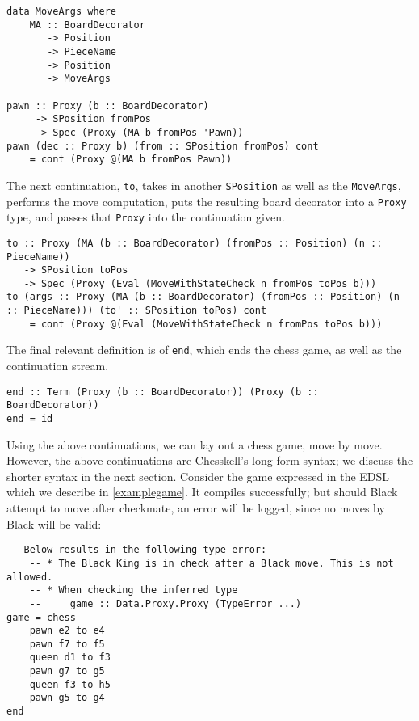\documentclass[12pt, a4paper, bibliography=totocnumbered]{scrreprt}
\newcommand{\inline}[1]{\lstinline[basicstyle=\ttfamily\footnotesize]{#1}}
\begin{document}
\begin{lstlisting}
data MoveArgs where
    MA :: BoardDecorator
       -> Position
       -> PieceName
       -> Position
       -> MoveArgs

pawn :: Proxy (b :: BoardDecorator)
     -> SPosition fromPos
     -> Spec (Proxy (MA b fromPos 'Pawn))
pawn (dec :: Proxy b) (from :: SPosition fromPos) cont
    = cont (Proxy @(MA b fromPos Pawn))
\end{lstlisting}

The next continuation, \inline{to}, takes in another \inline{SPosition} as well as the \lstinline{MoveArgs}, performs the move computation, puts the resulting board decorator into a \inline{Proxy} type, and passes that \inline{Proxy} into the continuation given.

\begin{lstlisting}
to :: Proxy (MA (b :: BoardDecorator) (fromPos :: Position) (n :: PieceName))
   -> SPosition toPos
   -> Spec (Proxy (Eval (MoveWithStateCheck n fromPos toPos b)))
to (args :: Proxy (MA (b :: BoardDecorator) (fromPos :: Position) (n :: PieceName))) (to' :: SPosition toPos) cont
    = cont (Proxy @(Eval (MoveWithStateCheck n fromPos toPos b)))
\end{lstlisting}

The final relevant definition is of \inline{end}, which ends the chess game, as well as the continuation stream.

\begin{lstlisting}
end :: Term (Proxy (b :: BoardDecorator)) (Proxy (b :: BoardDecorator))
end = id
\end{lstlisting}

Using the above continuations, we can lay out a chess game, move by move. However, the above continuations are Chesskell's long-form syntax; we discuss the shorter syntax in the next section. Consider the game expressed in the EDSL which we describe in \cref{examplegame}. It compiles successfully; but should Black attempt to move after checkmate, an error will be logged, since no moves by Black will be valid:

\begin{lstlisting}
-- Below results in the following type error:
    -- * The Black King is in check after a Black move. This is not allowed.
    -- * When checking the inferred type
    --     game :: Data.Proxy.Proxy (TypeError ...)
game = chess
    pawn e2 to e4
    pawn f7 to f5
    queen d1 to f3
    pawn g7 to g5
    queen f3 to h5
    pawn g5 to g4
end
\end{lstlisting}
\end{document}

